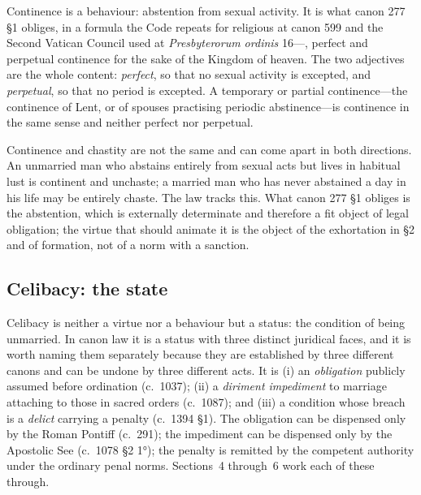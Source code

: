 Continence is a behaviour: abstention from sexual activity. It is what canon 277 §1 obliges, in a formula the Code repeats for religious at canon 599 and the Second Vatican Council used at \emph{Presbyterorum ordinis} 16---, perfect and perpetual continence for the sake of the Kingdom of heaven. The two adjectives are the whole content: \emph{perfect}, so that no sexual activity is excepted, and \emph{perpetual}, so that no period is excepted. A temporary or partial continence---the continence of Lent, or of spouses practising periodic abstinence---is continence in the same sense and neither perfect nor perpetual.

Continence and chastity are not the same and can come apart in both directions. An unmarried man who abstains entirely from sexual acts but lives in habitual lust is continent and unchaste; a married man who has never abstained a day in his life may be entirely chaste. The law tracks this. What canon 277 §1 obliges is the abstention, which is externally determinate and therefore a fit object of legal obligation; the virtue that should animate it is the object of the exhortation in §2 and of formation, not of a norm with a sanction.

\subsection{Celibacy: the state}

Celibacy is neither a virtue nor a behaviour but a status: the condition of being unmarried. In canon law it is a status with three distinct juridical faces, and it is worth naming them separately because they are established by three different canons and can be undone by three different acts. It is (i) an \emph{obligation} publicly assumed before ordination (c.~1037); (ii) a \emph{diriment impediment} to marriage attaching to those in sacred orders (c.~1087); and (iii) a condition whose breach is a \emph{delict} carrying a  penalty (c.~1394 §1). The obligation can be dispensed only by the Roman Pontiff (c.~291); the impediment can be dispensed only by the Apostolic See (c.~1078 §2 1°); the penalty is remitted by the competent authority under the ordinary penal norms. Sections~4 through~6 work each of these through.

